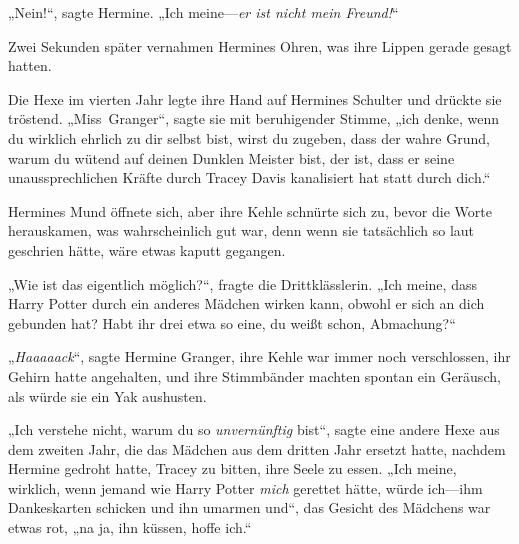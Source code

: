 „Nein!“, sagte Hermine. „Ich meine—\emph{er ist nicht mein Freund!}“

Zwei Sekunden später vernahmen Hermines Ohren, was ihre Lippen gerade gesagt hatten.

Die Hexe im vierten Jahr legte ihre Hand auf Hermines Schulter und drückte sie tröstend. „Miss~Granger“, sagte sie mit beruhigender Stimme, „ich denke, wenn du wirklich ehrlich zu dir selbst bist, wirst du zugeben, dass der wahre Grund, warum du wütend auf deinen Dunklen Meister bist, der ist, dass er seine unaussprechlichen Kräfte durch Tracey Davis kanalisiert hat statt durch dich.“

Hermines Mund öffnete sich, aber ihre Kehle schnürte sich zu, bevor die Worte herauskamen, was wahrscheinlich gut war, denn wenn sie tatsächlich so laut geschrien hätte, wäre etwas kaputt gegangen.

„Wie ist das eigentlich möglich?“, fragte die Drittklässlerin. „Ich meine, dass Harry Potter durch ein anderes Mädchen wirken kann, obwohl er sich an dich gebunden hat? Habt ihr drei etwa so eine, du weißt schon, Abmachung?“

„\emph{Haaaaack}“, sagte Hermine Granger, ihre Kehle war immer noch verschlossen, ihr Gehirn hatte angehalten, und ihre Stimmbänder machten spontan ein Geräusch, als würde sie ein Yak aushusten.


„Ich verstehe nicht, warum du so \emph{unvernünftig} bist“, sagte eine andere Hexe aus dem zweiten Jahr, die das Mädchen aus dem dritten Jahr ersetzt hatte, nachdem Hermine gedroht hatte, Tracey zu bitten, ihre Seele zu essen. „Ich meine, wirklich, wenn jemand wie Harry Potter \emph{mich} gerettet hätte, würde ich—ihm Dankeskarten schicken und ihn umarmen und“, das Gesicht des Mädchens war etwas rot, „na ja, ihn küssen, hoffe ich.“

